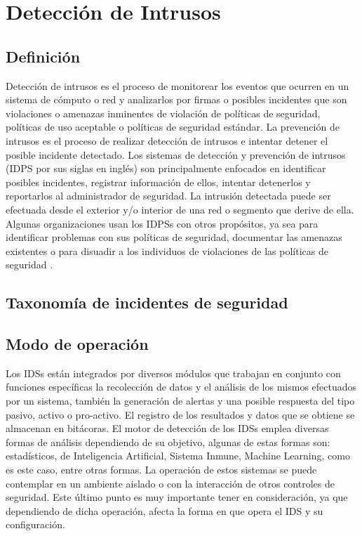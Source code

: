\section{Detección de Intrusos}

\subsection{Definición}

Detección de intrusos es el proceso de monitorear los eventos que ocurren en un sistema de cómputo o red y analizarlos por firmas o posibles incidentes que son violaciones o amenazas inminentes de violación de políticas de seguridad, políticas de uso aceptable o políticas de seguridad estándar. La prevención de intrusos es el proceso de realizar detección de intrusos e intentar detener el posible incidente detectado. Los sistemas de detección y prevención de intrusos (IDPS por sus siglas en inglés) son principalmente enfocados en identificar posibles incidentes, registrar información de ellos, intentar detenerlos y reportarlos al administrador de seguridad. La intrusión detectada puede ser efectuada desde el exterior y/o interior de una red o segmento que derive de ella. Algunas organizaciones usan los IDPSs con otros propósitos, ya sea para identificar problemas con sus políticas de seguridad, documentar las amenazas existentes o para disuadir a los individuos de violaciones de las políticas de seguridad \cite{nist94}. \\

\subsection{Taxonomía de incidentes de seguridad}

\subsection{Modo de operación}

Los IDSs están integrados por diversos módulos que trabajan en conjunto con funciones específicas la recolección de datos y el análisis de los mismos efectuados por un sistema, también la generación de alertas y una posible respuesta del tipo pasivo, activo o pro-activo. El registro de los resultados y datos que se obtiene se almacenan en bitácoras. El motor de detección de los IDSs emplea diversas formas de análisis dependiendo de su objetivo, algunas de estas formas son: estadísticos, de Inteligencia Artificial, Sistema Inmune, Machine Learning, como es este caso, entre otras formas. La operación de estos sistemas se puede contemplar en un ambiente aislado o con la interacción de otros controles de seguridad. Este último punto es muy importante tener en consideración, ya que dependiendo de dicha operación, afecta la forma en que opera el IDS y su configuración. 
\\

